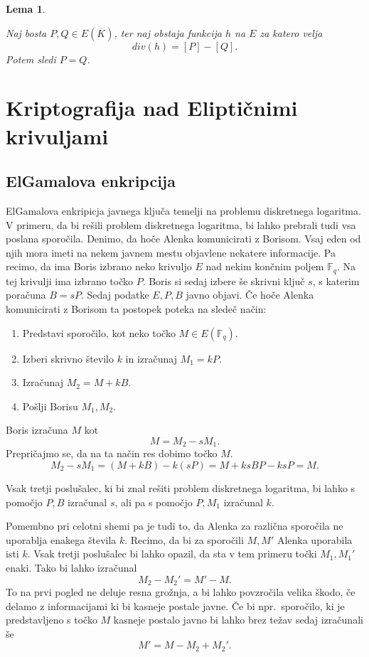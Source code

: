 \documentclass[12pt,a4paper,twoside]{article}
\theoremstyle{definition} %
\theoremstyle{plain} %
\newtheorem{lema}[definicija]{Lema}
\numberwithin{equation}{section}  %
\newcommand{\F}{\mathbb F}
\newcommand{\E}[1]{E({#1})}
\begin{document}
\begin{lema}
\label{lema 11.3}

Naj bosta $P,Q \in \E{\overline{K}}$, ter naj obstaja funkcija $h$ na $E$ za katero velja
$$div(h)=[P]-[Q].$$
Potem sledi $P=Q$.
\end{lema}



\section{Kriptografija nad Eliptičnimi krivuljami}

\subsection{ElGamalova enkripcija}

ElGamalova enkripicja javnega ključa temelji na problemu diskretnega logaritma. V primeru, da bi rešili problem diskretnega logaritma, bi lahko prebrali tudi vsa poslana sporočila. Denimo, da hoče Alenka komunicirati z Borisom. Vsaj eden od njih mora imeti na nekem javnem mestu objavlene nekatere informacije. Pa recimo, da ima Boris izbrano neko krivuljo $E$ nad nekim končnim poljem $\F_q$. Na tej krivulji ima izbrano točko $P$. Boris si sedaj izbere še skrivni ključ $s$, s katerim poračuna $B=sP$. Sedaj podatke $E,P,B$ javno objavi. Če hoče Alenka komunicirati z Borisom ta postopek poteka na sledeč način:
\begin{enumerate}
\item Predstavi sporočilo, kot neko točko $M\in \E{\F_q}$.
\item Izberi skrivno število $k$ in izračunaj $M_1 = kP$.
\item Izračunaj $M_2 = M+kB$.
\item Pošlji Borisu $M_1,M_2$.
\end{enumerate}

Boris izračuna $M$ kot
$$M = M_2-sM_1.$$
Prepričajmo se, da na ta način res dobimo točko $M$.
$$M_2-sM_1 = (M+kB)-k(sP)=M+ksBP-ksP = M.$$

Vsak tretji poslušalec, ki bi znal rešiti problem diskretnega logaritma, bi lahko s pomočjo $P,B$ izračunal $s$, ali pa s pomočjo $P,M_1$ izračunal $k$.

Pomembno pri celotni shemi pa je tudi to, da Alenka za različna sporočila ne uporablja enakega števila $k$. Recimo, da bi za sporočili $M,M'$ Alenka uporabila isti $k$. Vsak tretji poslušalec bi lahko opazil, da sta v tem primeru točki $M_1,M_1'$ enaki. Tako bi lahko izračunal
$$M_2-M_2' = M'-M.$$
To na prvi pogled ne deluje resna grožnja, a bi lahko povzročila velika škodo, če delamo z informacijami ki bi kasneje postale javne. Če bi npr.\ sporočilo, ki je predstavljeno s točko $M$ kasneje postalo javno bi lahko brez težav sedaj izračunali še
$$M' = M-M_2+M_2'.$$
\end{document}
